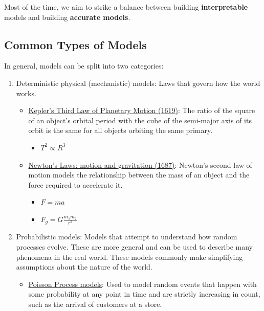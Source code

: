 \documentclass[
  letterpaper,
  DIV=11,
  numbers=noendperiod]{scrreprt}
\providecommand{\tightlist}{%
  \setlength{\itemsep}{0pt}\setlength{\parskip}{0pt}}\usepackage{longtable,booktabs,array}
\begin{document}
Most of the time, we aim to strike a balance between building
\textbf{interpretable} models and building \textbf{accurate models}.

\subsection{Common Types of Models}\label{common-types-of-models}

In general, models can be split into two categories:

\begin{enumerate}
\def\labelenumi{\arabic{enumi}.}
\item
  Deterministic physical (mechanistic) models: Laws that govern how the
  world works.

  \begin{itemize}
  \tightlist
  \item
    \href{https://en.wikipedia.org/wiki/Kepler\%27s_laws_of_planetary_motion\#Third_law}{Kepler's
    Third Law of Planetary Motion (1619)}: The ratio of the square of an
    object's orbital period with the cube of the semi-major axis of its
    orbit is the same for all objects orbiting the same primary.

    \begin{itemize}
    \tightlist
    \item
      \(T^2 \propto R^3\)
    \end{itemize}
  \item
    \href{https://en.wikipedia.org/wiki/Newton\%27s_laws_of_motion}{Newton's
    Laws: motion and gravitation (1687)}: Newton's second law of motion
    models the relationship between the mass of an object and the force
    required to accelerate it.

    \begin{itemize}
    \tightlist
    \item
      \(F = ma\)
    \item
      \(F_g = G \frac{m_1 m_2}{r^2}\)
    \end{itemize}
  \end{itemize}
\item
  Probabilistic models: Models that attempt to understand how random
  processes evolve. These are more general and can be used to describe
  many phenomena in the real world. These models commonly make
  simplifying assumptions about the nature of the world.

  \begin{itemize}
  \tightlist
  \item
    \href{https://en.wikipedia.org/wiki/Poisson_point_process}{Poisson
    Process models}: Used to model random events that happen with some
    probability at any point in time and are strictly increasing in
    count, such as the arrival of customers at a store.
  \end{itemize}
\end{enumerate}
\end{document}
